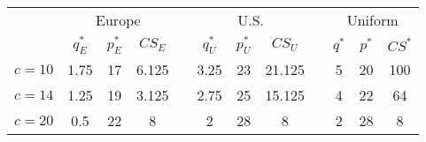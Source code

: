 \documentclass[]{standalone}
\begin{document}
\begin{tabular}{ c  c |c |c c c |c |ccc |c |c}
  & \multicolumn{3}{c}{Europe} && \multicolumn{3}{c}{U.S.} && \multicolumn{3}{c}{Uniform} \\ 
\cmidrule{2-4} \cmidrule{6-8} \cmidrule{9-12}

 & {\centering $q_E^*$}& $p_E^*$ & $CS_E$ &&$q_U^*$ & $p_U^*$ & $CS_U$ && $q^*$ & $p^*$ & $CS^*$\\
\midrule
$c=10$ & 1.75 & 17 & 6.125 &&3.25 & 23 & 21.125 && 5 & 20&100  \\
$c=14$ & 1.25 & 19 & 3.125 && 2.75 & 25 & 15.125 && 4 & 22 & 64 \\
$c=20$ & 0.5 & 22 & 8 && 2 & 28 & 8 && 2 & 28 & 8 \\ 
\end{tabular}
\end{document}
